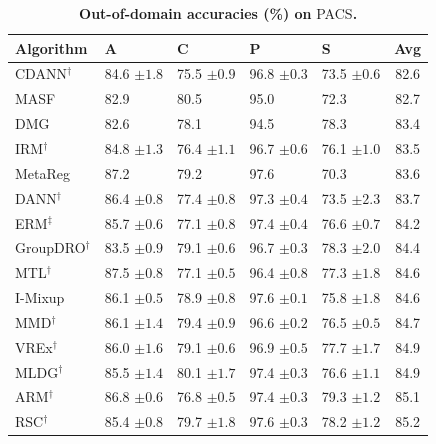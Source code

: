 \documentclass[10pt]{article}
\newcommand{\data}[1]{\textsc{#1}}
\begin{document}
\begin{table}[H]
\centering
\small
\renewcommand{\arraystretch}{1.1}
\caption{\small\textbf{Out-of-domain accuracies (\%) on} \data{PACS}\textbf{.}}
\begin{tabular}{lllll|c}
\toprule
\textbf{Algorithm} & \textbf{A} & \textbf{C} & \textbf{P} & \textbf{S} & \textbf{Avg} \\
\midrule
CDANN$^\dagger$ & 84.6 \scriptsize$\pm1.8$ & 75.5 \scriptsize$\pm0.9$ & 96.8 \scriptsize$\pm0.3$ & 73.5 \scriptsize$\pm0.6$ & 82.6 \\
MASF & 82.9 & 80.5 & 95.0 & 72.3 & 82.7 \\
DMG & 82.6 & 78.1 & 94.5 & 78.3 & 83.4 \\
IRM$^\dagger$ & 84.8 \scriptsize$\pm1.3$ & 76.4 \scriptsize$\pm1.1$ & 96.7 \scriptsize$\pm0.6$ & 76.1 \scriptsize$\pm1.0$ & 83.5 \\
MetaReg & 87.2 & 79.2 & 97.6 & 70.3 & 83.6 \\
DANN$^\dagger$ & 86.4 \scriptsize$\pm0.8$ & 77.4 \scriptsize$\pm0.8$ & 97.3 \scriptsize$\pm0.4$ & 73.5 \scriptsize$\pm2.3$ & 83.7 \\
ERM$^\ddagger$ & 85.7 \scriptsize$\pm0.6$ & 77.1 \scriptsize$\pm0.8$ & 97.4 \scriptsize$\pm0.4$ & 76.6 \scriptsize$\pm0.7$ & 84.2 \\
GroupDRO$^\dagger$ & 83.5 \scriptsize$\pm0.9$ & 79.1 \scriptsize$\pm0.6$ & 96.7 \scriptsize$\pm0.3$ & 78.3 \scriptsize$\pm2.0$ & 84.4 \\
MTL$^\dagger$ & 87.5 \scriptsize$\pm0.8$ & 77.1 \scriptsize$\pm0.5$ & 96.4 \scriptsize$\pm0.8$ & 77.3 \scriptsize$\pm1.8$ & 84.6 \\
I-Mixup & 86.1 \scriptsize$\pm0.5$ & 78.9 \scriptsize$\pm0.8$ & 97.6 \scriptsize$\pm0.1$ & 75.8 \scriptsize$\pm1.8$ & 84.6 \\
MMD$^\dagger$ & 86.1 \scriptsize$\pm1.4$ & 79.4 \scriptsize$\pm0.9$ & 96.6 \scriptsize$\pm0.2$ & 76.5 \scriptsize$\pm0.5$ & 84.7 \\
VREx$^\dagger$ & 86.0 \scriptsize$\pm1.6$ & 79.1 \scriptsize$\pm0.6$ & 96.9 \scriptsize$\pm0.5$ & 77.7 \scriptsize$\pm1.7$ & 84.9 \\
MLDG$^\dagger$ & 85.5 \scriptsize$\pm1.4$ & 80.1 \scriptsize$\pm1.7$ & 97.4 \scriptsize$\pm0.3$ & 76.6 \scriptsize$\pm1.1$ & 84.9 \\
ARM$^\dagger$ & 86.8 \scriptsize$\pm0.6$ & 76.8 \scriptsize$\pm0.5$ & 97.4 \scriptsize$\pm0.3$ & 79.3 \scriptsize$\pm1.2$ & 85.1 \\
RSC$^\dagger$ & 85.4 \scriptsize$\pm0.8$ & 79.7 \scriptsize$\pm1.8$ & 97.6 \scriptsize$\pm0.3$ & 78.2 \scriptsize$\pm1.2$ & 85.2 \\

\end{tabular}
\end{table}
\end{document}
